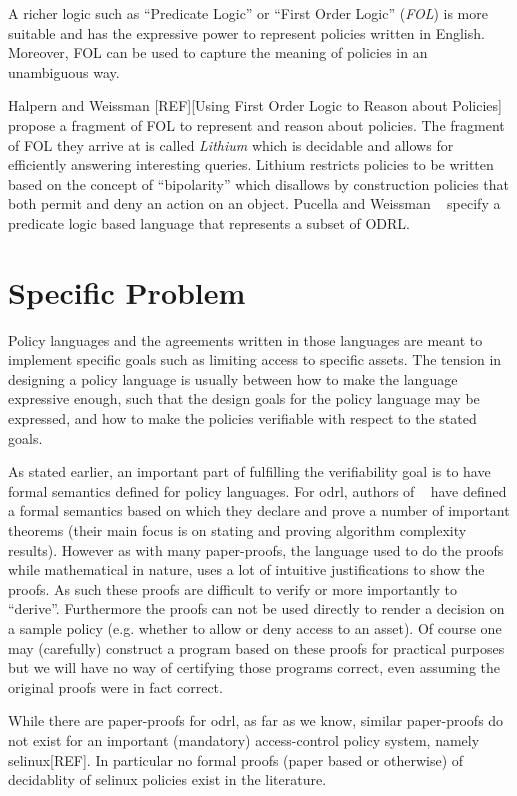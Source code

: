 A richer logic such as ``Predicate Logic'' or ``First Order Logic'' (\emph{FOL}) is more suitable and has the expressive power to represent policies written in English. Moreover, FOL can be used to capture the meaning of policies in an unambiguous way.

Halpern and Weissman [REF][Using First Order Logic to Reason about Policies] propose a fragment of FOL to represent and reason about policies. The fragment of FOL they arrive at is called \emph{Lithium} which is decidable and allows for efficiently answering interesting queries. Lithium restricts policies to be written based on the concept of ``bipolarity'' which disallows by construction policies that both permit and deny an action on an object. Pucella and Weissman ~\cite{pucella2006} specify a predicate logic based language that represents a subset of ODRL.


\section{Specific Problem}

Policy languages and the agreements written in those languages are meant to implement specific goals such as limiting access to specific assets. The tension in designing a policy language is usually between how to make the language expressive enough, such that the design goals for the policy language may be expressed, and how to make the policies verifiable with respect to the stated goals.

As stated earlier, an important part of fulfilling the verifiability goal is to have formal semantics defined for policy languages. For \ac{odrl}, authors of ~\cite{pucella2006} have defined a formal semantics based on which they declare and prove a number of important theorems (their main focus is on stating and proving algorithm complexity results). However as with many paper-proofs, the language used to do the proofs while mathematical in nature, uses a lot of intuitive justifications to show the proofs. As such these proofs are difficult to verify or more importantly to ``derive''. Furthermore the proofs can not be used directly to render a decision on a sample policy (e.g. whether to allow or deny access to an asset). Of course one may (carefully) construct a program based on these proofs for practical purposes but we will have no way of certifying those programs correct, even assuming the original proofs were in fact correct.

While there are paper-proofs for \ac{odrl}, as far as we know, similar paper-proofs do not exist for an important (mandatory) access-control policy system, namely \ac{selinux}[REF]. In particular no formal proofs (paper based or otherwise) of decidablity of \ac{selinux} policies exist in the literature. 


